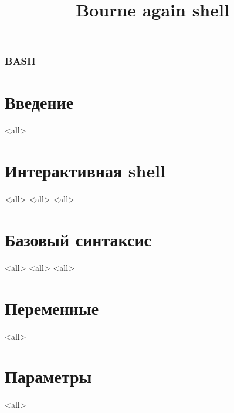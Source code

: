 
\title[bash]{Bourne again shell}




\begin{frame}
	\frametitle{BASH}
	\titlepage
	\vspace{-0.5cm}
	\begin{center}
	\end{center}
\end{frame}


\section{Введение}

\mode<all>{}
\section{Интерактивная shell}
\mode<all>{}
\mode<all>{}
\mode<all>{}

\section[Runtime]{Базовый синтаксис}

\mode<all>{}
\mode<all>{}
\mode<all>{}

\section{Переменные}

\mode<all>{}

\section{Параметры}

\mode<all>{}





